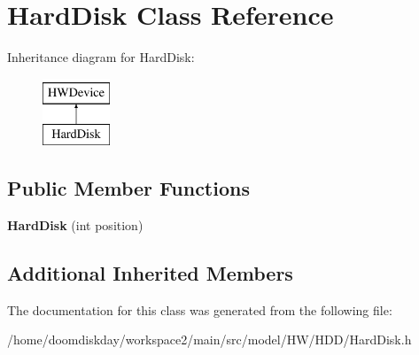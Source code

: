 \hypertarget{classHardDisk}{}\section{Hard\+Disk Class Reference}
\label{classHardDisk}
Inheritance diagram for Hard\+Disk\+:\begin{figure}[H]
\begin{center}
\leavevmode
\includegraphics[height=2.000000cm]{classHardDisk}
\end{center}
\end{figure}
\subsection*{Public Member Functions}
\begin{DoxyCompactItemize}
\item 
{\bfseries Hard\+Disk} (int position)\hypertarget{classHardDisk_a48f797f4d6e17eb804ce29a3910fda85}{}\label{classHardDisk_a48f797f4d6e17eb804ce29a3910fda85}

\end{DoxyCompactItemize}
\subsection*{Additional Inherited Members}


The documentation for this class was generated from the following file\+:\begin{DoxyCompactItemize}
\item 
/home/doomdiskday/workspace2/main/src/model/\+H\+W/\+H\+D\+D/Hard\+Disk.\+h\end{DoxyCompactItemize}
